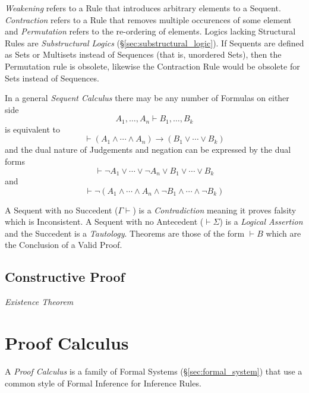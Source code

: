 \emph{Weakening} refers to a Rule that introduces arbitrary elements
to a Sequent. \emph{Contraction} refers to a Rule that removes
multiple occurences of some element and \emph{Permutation} refers to
the re-ordering of elements. Logics lacking Structural Rules are
\emph{Substructural Logics} (\S\ref{sec:substructural_logic}). If
Sequents are defined as Sets or Multisets instead of Sequences (that
is, unordered Sets), then the Permutation rule is obsolete, likewise
the Contraction Rule would be obsolete for Sets instead of Sequences.

In a general \emph{Sequent Calculus} there may be any
number of Formulas on either side
\[
    A_1, \ldots, A_n \vdash B_1, \ldots, B_k
\]
is equivalent to
\[
    \vdash(A_1 \wedge \cdots \wedge A_n) \rightarrow (B_1 \vee \cdots \vee B_k)
\]
and the dual nature of Judgements and negation can be expressed by the
dual forms
\[
    \vdash \neg A_1 \vee \cdots \vee \neg A_n \vee B_1 \vee \cdots
    \vee B_k
\]
and
\[
    \vdash \neg(A_1 \wedge \cdots \wedge A_n \wedge \neg B_1 \wedge
    \cdots \wedge \neg B_k)
\]

A Sequent with no Succedent ($\Gamma \vdash$) is a
\emph{Contradiction} meaning it proves falsity which is
Inconsistent. A Sequent with no Antecedent ($\vdash \Sigma$) is a
\emph{Logical Assertion} and the Succedent is a
\emph{Tautology}. Theorems are those of the form $\vdash B$ which are
the Conclusion of a Valid Proof.



\subsection{Constructive Proof}\label{sec:constructive_proof}

\emph{Existence Theorem}



\section{Proof Calculus}\label{sec:proof_calculus}

A \emph{Proof Calculus} is a family of Formal Systems
(\S\ref{sec:formal_system}) that use a common style of Formal
Inference for Inference Rules.



